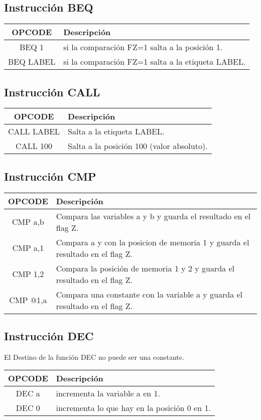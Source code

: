 \documentclass[12pt]{article}
\begin{document}
\subsection{Instrucci\'on BEQ}

\begin{tabular}{| c | p{11.5cm}|}
\hline 
OPCODE & Descripci\'on  \\ \hline
BEQ 1     & si la comparaci\'on FZ=1 salta a la posici\'on 1.\\ \hline
BEQ LABEL & si la comparaci\'on FZ=1 salta a la etiqueta LABEL.\\ \hline
\end{tabular}

\subsection{Instrucci\'on CALL }
\begin{tabular}{| c | p{11.5cm}|}
\hline 
OPCODE & Descripci\'on  \\ \hline
CALL LABEL & Salta a la etiqueta LABEL.\\ \hline
CALL 100 & Salta a la posici\'on 100  (valor absoluto).\\ \hline
\end{tabular}

\subsection{Instrucci\'on CMP }

\begin{tabular}{| c | p{11.5cm}|}
\hline 
OPCODE & Descripci\'on  \\ \hline
CMP a,b & Compara las variables a y b y guarda el resultado en el flag Z.\\ \hline
CMP a,1 & Compara a y con la posicion de memoria 1 y guarda el resultado en el flag Z.\\ \hline
CMP 1,2 & Compara la posici\'on de memoria 1 y 2 y guarda el resultado en el flag Z.\\ \hline
CMP @1,a & Compara una constante con la variable a y guarda el resultado en el flag Z.\\ \hline
\end{tabular}

\subsection{Instrucci\'on DEC }
El Destino de la funci\'on DEC no puede ser una constante.\\
\begin{tabular}{| c | p{11.5cm}|}
\hline 
OPCODE & Descripci\'on  \\ \hline
DEC a & incrementa la variable a en 1.\\ \hline
DEC 0 & incrementa lo que hay en la posici\'on 0 en 1.\\ \hline
\end{tabular}
\end{document}
